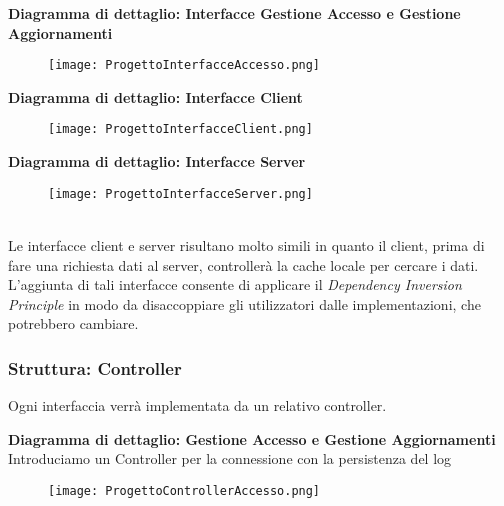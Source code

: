 \textbf{Diagramma di dettaglio: Interfacce Gestione Accesso e Gestione Aggiornamenti}
\begin{figure}[h!]
    \begin{center}
        \texttt{[image: ProgettoInterfacceAccesso.png]}
    \end{center}
\end{figure}

\textbf{Diagramma di dettaglio: Interfacce Client}
\begin{figure}[h!]
    \begin{center}
        \texttt{[image: ProgettoInterfacceClient.png]}
    \end{center}
\end{figure}

\textbf{Diagramma di dettaglio: Interfacce Server}
\begin{figure}[h!]
    \begin{center}
        \texttt{[image: ProgettoInterfacceServer.png]}
    \end{center}
\end{figure}\\

Le interfacce client e server risultano molto simili in quanto il client, prima di fare una richiesta dati al server, controllerà la cache locale per cercare i dati.
L'aggiunta di tali interfacce consente di applicare il \textit{Dependency Inversion Principle}
in modo da disaccoppiare gli utilizzatori dalle implementazioni, che potrebbero cambiare.

\clearpage

\subsubsection{Struttura: Controller}

Ogni interfaccia verrà implementata da un relativo controller.
\vspace{1em}

\textbf{Diagramma di dettaglio: Gestione Accesso e Gestione Aggiornamenti}
\\Introduciamo un Controller per la connessione con la persistenza del log
\begin{figure}[h!]
    \begin{center}
        \texttt{[image: ProgettoControllerAccesso.png]}
    \end{center}
\end{figure}

